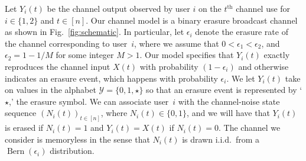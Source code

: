 Let $Y_{i}(t)$ be the channel output observed by user $i$ on the $t^{\mathrm{th}}$ channel use for $i \in \{1, 2\}$ and $t \in [n]$.  Our channel model is a binary erasure broadcast channel as shown in Fig.~\ref{fig:schematic}.  In particular, let $\epsilon_i$ denote the erasure rate of the channel corresponding to user~$i$, where we assume that $0 < \epsilon_{1} < \epsilon_{2}$, and $\epsilon_2 = 1 - 1/M$ for some integer $M > 1$.  Our model specifies that $Y_{i}(t)$ exactly reproduces the channel input $X(t)$ with probability $(1 - \epsilon_i)$ and otherwise indicates an erasure event, which happens with probability $\epsilon_i$.  We let $Y_{i}(t)$ take on values in the alphabet $\mathcal{Y} = \{0, 1, \star\}$ so that an erasure event is represented by `$\star$,' the erasure symbol.  
We can associate user~$i$ with the channel-noise state sequence $(N_i(t))_{t \in [n]}$, where $N_i(t) \in \{0,1\}$, and we will have that $Y_i(t)$ is erased if $N_{i}(t) = 1$ and $Y_{i}(t) = X(t)$ if $N_i(t) = 0$.  The channel we consider is memoryless in the sense that $N_{i}(t)$ is drawn i.i.d.\ from a $\operatorname{Bern}(\epsilon_{i})$ distribution.


